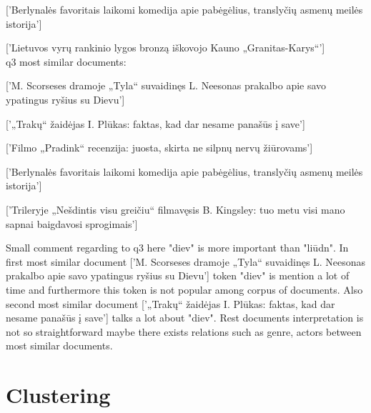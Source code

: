 \documentclass{article}
\begin{document}
['Berlynalės favoritais laikomi komedija apie pabėgėlius, translyčių asmenų meilės istorija']

['Lietuvos vyrų rankinio lygos bronzą iškovojo Kauno „Granitas-Karys“']\\

q3 most similar documents:

['M. Scorseses dramoje „Tyla“ suvaidinęs L. Neesonas prakalbo apie savo ypatingus ryšius su Dievu']

['„Trakų“ žaidėjas I. Plūkas: faktas, kad dar nesame panašūs į save']

['Filmo „Pradink“ recenzija: juosta, skirta ne silpnų nervų žiūrovams']

['Berlynalės favoritais laikomi komedija apie pabėgėlius, translyčių asmenų meilės istorija']

['Trileryje „Nešdintis visu greičiu“ filmavęsis B. Kingsley: tuo metu visi mano sapnai baigdavosi sprogimais']


Small comment regarding to q3 here "diev" is more important than "liūdn". In first most similar document ['M. Scorseses dramoje „Tyla“ suvaidinęs L. Neesonas prakalbo apie savo ypatingus ryšius su Dievu'] token "diev" is mention a lot of time and furthermore this token is not popular among corpus of documents. Also second most similar document ['„Trakų“ žaidėjas I. Plūkas: faktas, kad dar nesame panašūs į save'] talks a lot about "diev". Rest documents interpretation is not so straightforward maybe there exists relations such as genre, actors between most similar documents.

\section{Clustering}
\end{document}
